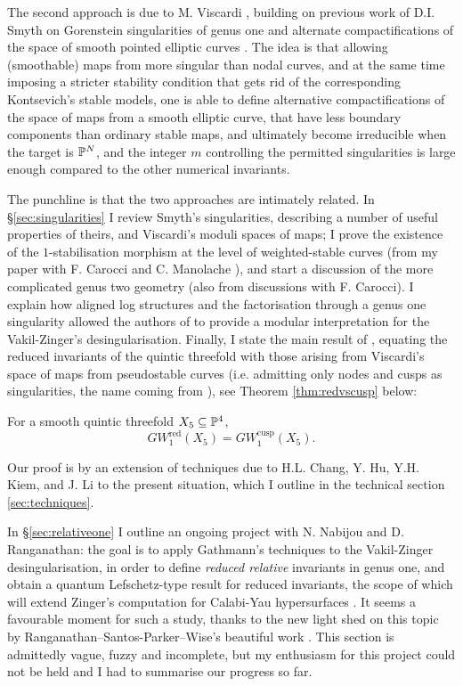 The second approach is due to M. Viscardi \cite{VISC}, building on previous work of D.I. Smyth on Gorenstein singularities of genus one and alternate compactifications of the space of smooth pointed elliptic curves \cite{SMY1}. The idea is that allowing (smoothable) maps from more singular than nodal curves, and at the same time imposing a stricter stability condition that gets rid of the corresponding Kontsevich's stable models, one is able to define alternative compactifications of the space of maps from a smooth elliptic curve, that have less boundary components than ordinary stable maps, and ultimately become irreducible when the target is $\mathbb P^N$, and the integer $m$ controlling the permitted singularities is large enough compared to the other numerical invariants.

The punchline is that the two approaches are intimately related. In \S \ref{sec:singularities} I review Smyth's singularities, describing a number of useful properties of theirs, and Viscardi's moduli spaces of maps; I prove the existence of the $1$-stabilisation morphism at the level of weighted-stable curves (from my paper with F. Carocci and C. Manolache \cite{BCM}), and start a discussion of the more complicated genus two geometry (also from discussions with F. Carocci). I explain how aligned log structures and the factorisation through a genus one singularity allowed the authors of \cite{RSPW} to provide a modular interpretation for the Vakil-Zinger's desingularisation. Finally, I state the main result of \cite{BCM}, equating the reduced invariants of the quintic threefold with those arising from Viscardi's space of maps from pseudostable curves (i.e. admitting only nodes and cusps as singularities, the name coming from \cite{Schubert}), see Theorem \ref{thm:redvscusp} below:
\begin{thm*}
 For a smooth quintic threefold $X_5\subseteq \mathbb P^4$, \[GW_1^{\mathrm{red}}(X_5)=GW_1^{\mathrm{cusp}}(X_5).\]
\end{thm*}
Our proof is by an extension of techniques due to H.L. Chang, Y. Hu, Y.H. Kiem, and J. Li to the present situation, which I outline in the technical section \ref{sec:techniques}.

In \S \ref{sec:relativeone} I outline an ongoing project with N. Nabijou and D. Ranganathan: the goal is to apply Gathmann's techniques to the Vakil-Zinger desingularisation, in order to define \emph{reduced relative} invariants in genus one, and obtain a quantum Lefschetz-type result for reduced invariants, the scope of which will extend Zinger's computation for Calabi-Yau hypersurfaces \cite{Zinger-CYhyp}. It seems a favourable moment for such a study, thanks to the new light shed on this topic by Ranganathan--Santos-Parker--Wise's beautiful work \cites{RSPW,RSPW2}. This section is admittedly vague, fuzzy and incomplete, but my enthusiasm for this project could not be held and I had to summarise our progress so far.


